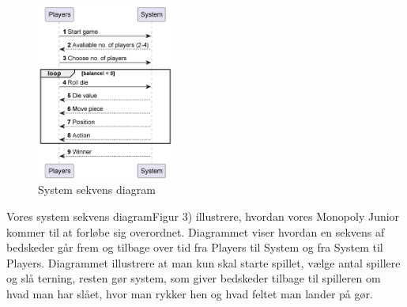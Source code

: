 \documentclass{article}
\begin{document}
\begin{figure} [h]
    \centering
    \includegraphics[width = 0.4\textwidth]{Billeder/Systemsekvensdiagram.png}
    \caption{System sekvens diagram}
    \label{System sekvens diagram}
\end{figure}
Vores system sekvens diagramFigur 3) illustrere, hvordan vores Monopoly Junior kommer til at forløbe sig overordnet. Diagrammet viser hvordan en sekvens af bedskeder går frem og tilbage over tid fra Players til System og fra System til Players. Diagrammet illustrere at man kun skal starte spillet, vælge antal spillere og slå terning, resten gør system, som giver bedskeder tilbage til spilleren om hvad man har slået, hvor man rykker hen og hvad feltet man lander på gør.     
\\
\end{document}
